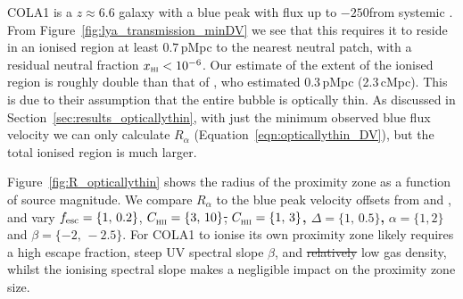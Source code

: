 \documentclass[fleqn,usenatbib]{mnras}
\providecommand{\DIFadd}[1]{{\protect\color{Green} {\bf #1}}} %
\providecommand{\DIFdel}[1]{{\protect\color{Gray} \scriptsize \sout{#1}}} %
\providecommand{\DIFaddbegin}{} %
\providecommand{\DIFaddend}{} %
\providecommand{\DIFdelbegin}{} %
\providecommand{\DIFdelend}{} %
\newcommand{\DIFscaledelfig}{0.5}
\newlength{\DIFdelgraphicswidth} %
\newlength{\DIFdelgraphicsheight} %
\newcommand{\DIFaddincludegraphics}[2][]{{\color{purple}\fbox{\DIFOincludegraphics[#1]{#2}}}} %
\newcommand{\DIFdelincludegraphics}[2][]{%
\sbox{\DIFdelgraphicsbox}{\DIFOincludegraphics[#1]{#2}}%
\settoboxwidth{\DIFdelgraphicswidth}{\DIFdelgraphicsbox} %
\settoboxtotalheight{\DIFdelgraphicsheight}{\DIFdelgraphicsbox} %
\scalebox{\DIFscaledelfig}{%
\parbox[b]{\DIFdelgraphicswidth}{\usebox{\DIFdelgraphicsbox}\\[-\baselineskip] \rule{\DIFdelgraphicswidth}{0em}}\llap{\resizebox{\DIFdelgraphicswidth}{\DIFdelgraphicsheight}{%
\setlength{\unitlength}{\DIFdelgraphicswidth}%
\begin{picture}(1,1)%
\thicklines\linethickness{2pt} %
{\color[rgb]{1,0,0}\put(0,0){\framebox(1,1){}}}%
{\color[rgb]{1,0,0}\put(0,0){\line( 1,1){1}}}%
{\color[rgb]{1,0,0}\put(0,1){\line(1,-1){1}}}%
\end{picture}%
}\hspace*{3pt}}} %
} %
\DeclareRobustCommand{\DIFaddbegin}{\DIFOaddbegin \let\includegraphics\DIFaddincludegraphics} %
\DeclareRobustCommand{\DIFaddend}{\DIFOaddend \let\includegraphics\DIFOincludegraphics} %
\DeclareRobustCommand{\DIFdelbegin}{\DIFOdelbegin \let\includegraphics\DIFdelincludegraphics} %
\DeclareRobustCommand{\DIFdelend}{\DIFOaddend \let\includegraphics\DIFOincludegraphics} %
\begin{document}
COLA1 is a $z \approx 6.6$ galaxy with a blue \lya peak with flux up to $-250$\kms from systemic \citep{Hu2016,Matthee2018b}. From Figure~\ref{fig:lya_transmission_minDV} we see that this requires it to reside in an ionised region at least $0.7$\,pMpc to the nearest neutral patch, with a residual neutral fraction $\xHI < 10^{-6}$. Our estimate of the extent of the ionised region is roughly double than that of \citet{Matthee2018b}, who estimated 0.3\,pMpc (2.3\,cMpc). This is due to their assumption that the entire bubble is optically thin. As discussed in Section~\ref{sec:results_opticallythin}, with just the minimum observed blue flux velocity we can only calculate $R_\alpha$ (Equation~\ref{eqn:opticallythin_DV}), but the total ionised region is much larger.

Figure~\ref{fig:R_opticallythin} shows the radius of the proximity zone as a function of source magnitude. We compare $R_\alpha$ to the blue peak velocity offsets from \citet{Matthee2018b} and \citet{Hashimoto2018a}, and vary $\fesc =\{1,\,0.2\}$, \DIFdelbegin \DIFdel{$\clump =\{3,\,10\}$, }\DIFdelend \DIFaddbegin \DIFadd{$\clump =\{1,\,3\}$, $\Delta =\{1,\,0.5\}$, }\DIFaddend $\alpha =\{1,2\}$ and $\beta = \{-2,\,-2.5\}$. For COLA1 to ionise its own proximity zone likely requires a high escape fraction, steep UV spectral slope $\beta$, and \DIFdelbegin \DIFdel{relatively }\DIFdelend low gas density, whilst the ionising spectral slope makes a negligible impact on the proximity zone size.
\end{document}
